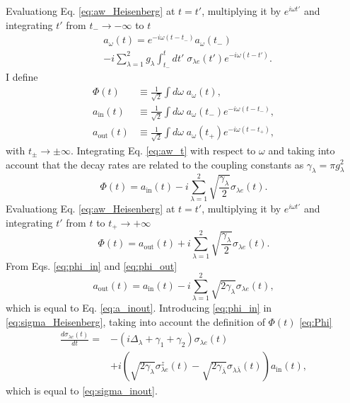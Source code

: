 \documentclass[notitlepage, prx, preprint, amsmath,superscriptaddress,amssymb]{revtex4-1}
\begin{document}
Evaluationg Eq. \eqref{eq:aw_Heisenberg} at $t=t'$, multiplying it by $e^{i\omega t'}$ and integrating $t'$ from $t_-\to -\infty$ to $t$
\begin{align}\label{eq:aw_t}
&a_\omega(t)=e^{-i\omega(t-t_-)} a_\omega(t_-)\nonumber\\
& - i\sum_{\lambda=1}^2 g_\lambda \int_{t_-}^t dt'\; \sigma_{\lambda e}(t')e^{-i\omega(t-t')}.
\end{align}
I define
\begin{align}
\label{eq:Phi}\Phi(t) & \equiv \frac{1}{\sqrt{2}}\int d\omega\; a_\omega (t),\\
a_\text{in}(t) & \equiv \frac{1}{\sqrt{2}}\int d\omega\; a_\omega(t_-) e^{-i\omega(t-t_-)},\\
a_\text{out}(t) & \equiv \frac{1}{\sqrt{2}}\int d\omega\; a_\omega(t_+) e^{-i\omega(t-t_+)},
\end{align}
with $t_\pm\to \pm\infty$. Integrating Eq. \eqref{eq:aw_t} with respect to $\omega$ and taking into account that the decay rates are related to the coupling constants as $\gamma_\lambda=\pi g_\lambda^2$
\begin{equation}\label{eq:phi_in}
\Phi(t)=a_\text{in}(t)-i\sum_{\lambda=1}^2\sqrt{\frac{\gamma_\lambda}{2}} \sigma_{\lambda e}(t).
\end{equation}
Evaluationg Eq. \eqref{eq:aw_Heisenberg} at $t=t'$, multiplying it by $e^{i\omega t'}$ and integrating $t'$ from $t$ to $t_+\to +\infty$
\begin{equation}\label{eq:phi_out}
\Phi(t)=a_\text{out}(t)+i\sum_{\lambda=1}^2\sqrt{\frac{\gamma_\lambda}{2}} \sigma_{\lambda e}(t).
\end{equation}
From Eqs. \eqref{eq:phi_in} and \eqref{eq:phi_out}
\begin{equation}
a_\text{out}(t)=a_\text{in}(t)-i\sum_{\lambda=1}^2 \sqrt{2\gamma_\lambda} \sigma_{\lambda e}(t),
\end{equation}
which is equal to Eq. \eqref{eq:a_inout}. Introducing \eqref{eq:phi_in} in \eqref{eq:sigma_Heisenberg}, taking into account the definition of $\Phi(t)$ \eqref{eq:Phi}
\begin{align}
\frac{d\sigma_{\lambda e}(t)}{dt}=&-(i\Delta_\lambda +\gamma_1+\gamma_2)\sigma_{\lambda e}(t)\nonumber\\
&+i(\sqrt{2\gamma_\lambda} \sigma_{\lambda e}^z(t) - \sqrt{2\gamma_{\overline{\lambda}}}\sigma_{\lambda\overline{\lambda}}(t))a_\text{in}(t),
\end{align} 
which is equal to \eqref{eq:sigma_inout}.
\end{document}
